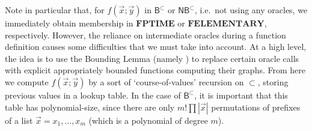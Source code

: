 \documentclass[10pt,a4paper]{amsart}
\theoremstyle{definition}
\theoremstyle{remark}
\newcommand{\permpref}{\subset}
\newcommand{\ptime}{\mathbf{PTIME}}
\newcommand{\elementary}{\mathbf{ELEMENTARY}}
\newcommand{\f}{\mathbf{F}}
\newcommand{\fptime}{\f\ptime}
\newcommand{\felementary}{\f\elementary}
\newcommand{\bc}{\mathsf{B}}
\newcommand{\bcwfpo}[1]{\bc^{#1}}
\newcommand{\nested}{\mathsf{N}}
\newcommand{\nbcwfpo}[1]{\nested\bcwfpo{#1}}
\newcommand{\bcpp}{\bcwfpo{\permpref}}
\newcommand{\nbcpp}{\nbcwfpo{\permpref}}
\begin{document}
Note in particular that, for $f(\vec x;\vec y)$ in $\bcpp$ or $\nbcpp$, i.e.\ not using any oracles, we immediately obtain membership in $\fptime$ or $\felementary$, respectively.
However, the reliance on intermediate oracles during a function definition causes some difficulties that we must take into account.
At a high level, the idea is to use the Bounding Lemma   (namely ) to replace certain oracle calls with explicit appropriately bounded functions computing their graphs. 
From here we compute $f(\vec x;\vec y)$ by a sort of `course-of-values' recursion on $\permpref$, storing previous values in a lookup table.
In the case of $\bcpp$, it is important that this table has polynomial-size, since there are only $m! \prod |\vec x|$ permutations of prefixes of a list $\vec x= x_1, \dots, x_m$ (which is a polynomial of degree $m$).
\end{document}
